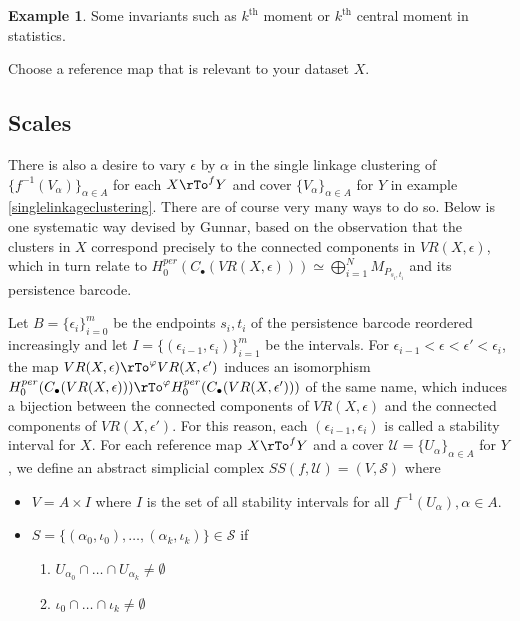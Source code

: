 \documentclass[12pt]{amsart}
\theoremstyle{definition}
\newtheorem{example}[theorem]{Example}
\begin{document}
\begin{example}\label{statisticalinvariants} Some invariants such as $k^{\text{th}}$ moment or $k^{\text{th}}$ central moment in statistics.
\end{example}

Choose a reference map that is relevant to your dataset $X$.

\subsection{Scales} There is also a desire to vary $\epsilon$ by $\alpha$ in the single linkage clustering of $\{f^{-1}(V_{\alpha})\}_{\alpha \in A}$ for each $X \rTo^f Y$ and cover $\{V_{\alpha}\}_{\alpha \in A}$ for $Y$ in example \ref{singlelinkageclustering}. There are of course very many ways to do so. Below is one systematic way devised by Gunnar, based on the observation that the clusters in $X$ correspond precisely to the connected components in $VR(X, \epsilon)$, which in turn relate to $H_0^{per}(C_{\bullet}(VR(X, \epsilon))) \simeq \bigoplus \limits_{i = 1}^N M_{P_{s_i, t_i}}$ and its persistence barcode.

Let $B = \{\epsilon_i\}_{i = 0}^m$ be the endpoints $s_i, t_i$ of the persistence barcode reordered increasingly and let $I = \{(\epsilon_{i-1}, \epsilon_i)\}_{i=1}^m$ be the intervals. For $\epsilon_{i-1} < \epsilon < \epsilon' < \epsilon_i$, the map $VR(X, \epsilon) \rTo^{\varphi} VR(X, \epsilon')$ induces an isomorphism $H_0^{per}(C_{\bullet}(VR(X, \epsilon))) \rTo^{\varphi} H_0^{per}(C_{\bullet}(VR(X, \epsilon')))$ of the same name, which induces a bijection between the connected components of $VR(X, \epsilon)$ and the connected components of $VR(X, \epsilon')$. For this reason, each $(\epsilon_{i-1}, \epsilon_i)$ is called a stability interval for $X$.
\dfn For each reference map $X \rTo^f Y$ and a cover $\mathcal{U} = \{U_{\alpha}\}_{\alpha \in A}$ for $Y$, we define an abstract simplicial complex $SS(f, \mathcal{U}) = (V, \mathcal{S})$ where
\begin{itemize}
\item $V = A \times I$ where $I$ is the set of all stability intervals for all $f^{-1}(U_{\alpha}), \alpha \in A$.
\item $S = \{(\alpha_0, \iota_0), \dots , (\alpha_k, \iota_k)\} \in \mathcal{S}$ if
\begin{enumerate}[1.]
\item $U_{\alpha_0} \cap \ldots \cap U_{\alpha_k} \neq \emptyset$
\item $\iota_0 \cap \ldots \cap \iota_k \neq \emptyset$
\end{enumerate}
\end{itemize}
\end{document}
